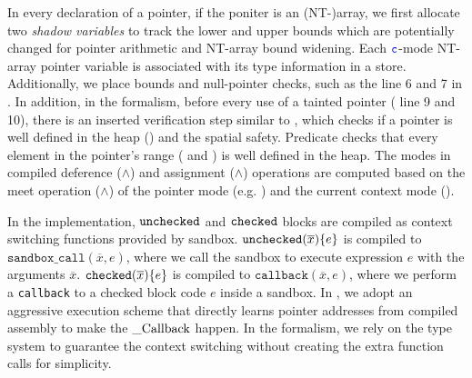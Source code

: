 
%
In every declaration of a pointer,
if the poniter is an (NT-)array,
we first allocate two \emph{shadow variables}
to track the lower and upper bounds which are potentially changed for pointer arithmetic and NT-array bound widening.
Each $\textcolor{blue}{\texttt{c}}$-mode NT-array pointer variable is associated with its type information in a store.
Additionally, we place bounds and null-pointer checks, such as the line 6 and 7 in .
In addition, in the formalism, before every use of a tainted pointer ( line 9 and 10), 
there is an inserted verification step similar to ,
which checks if a pointer is well defined in the heap () and the spatial safety.
Predicate  checks that every element in the pointer's range ( and ) is well defined in the heap.  
The modes in compiled deference ($\wedge$)
 and assignment ($\wedge$) operations 
are computed based on the meet 
operation ($\wedge$) of the pointer mode (e.g. ) and the current context mode ().

%
In the \systemname implementation,
$\mathtt{unchecked}$ and $\mathtt{checked}$ blocks 
are compiled as context switching functions provided by sandbox.
$\mathtt{unchecked}({\overline{x}})\{e\}$ is compiled to 
$\texttt{sandbox\_call}(\overline{x},e)$, where we call the sandbox 
to execute expression $e$ with the arguments $\overline{x}$.
$\mathtt{checked}({\overline{x}}){\{e\}}$ is compiled to 
$\texttt{callback}(\overline{x},e)$, where we perform 
a \texttt{callback} to a checked block code $e$ inside a sandbox.
In \systemname, we adopt an aggressive execution scheme that
directly learns pointer addresses from compiled assembly to make the $\code{_Callback}$ happen.
In the formalism, we rely on the type system to 
guarantee the context switching without creating the extra function calls for simplicity.

